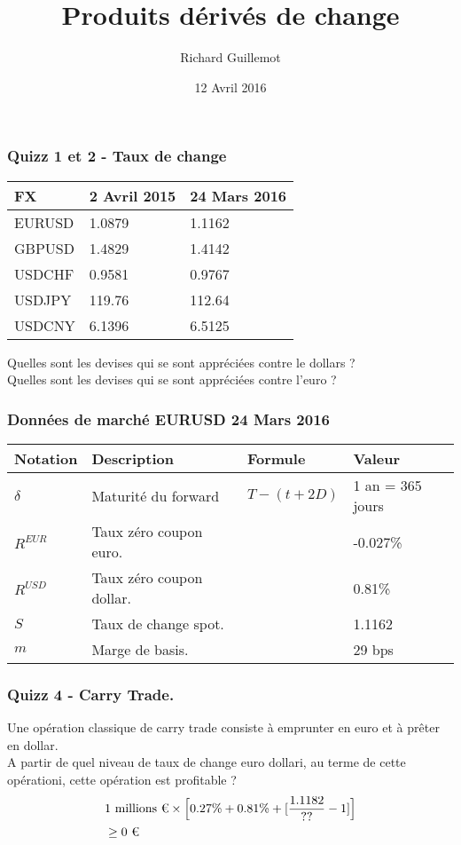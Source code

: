\documentclass{beamer}
\title[Produits dérivés de change et de credit]{Produits dérivés de change}
\author{Richard Guillemot}
\institute{DIFIQ}
\date{12 Avril 2016}
\begin{document}
\begin{frame}
\titlepage
\end{frame}

\begin{frame}
\frametitle{Quizz 1 et 2 - Taux de change}
\begin{center}
\begin{tabular}{|l|l|l|}
\hline
\textbf{FX} & 2 Avril 2015 & 24 Mars 2016  \\
\hline
\hline
EURUSD & 1.0879 & 1.1162  \\
GBPUSD &  1.4829 & 1.4142  \\
USDCHF & 0.9581 & 0.9767  \\
USDJPY & 119.76 & 112.64  \\
USDCNY & 6.1396 & 6.5125  \\
\hline		
\end{tabular}
\end{center}
\vspace{0.5cm}
Quelles sont les devises qui se sont appréciées contre le dollars ?\\
Quelles sont les devises qui se sont appréciées contre l'euro ?\\
\end{frame}

\begin{frame}
\small
\frametitle{Données de marché EURUSD  24 Mars 2016}
\begin{center}
\begin{tabular}{|l|l|l|l|}
\hline
\textbf{Notation} & \textbf{Description} & \textbf{Formule} & \textbf{Valeur} \\
\hline
\hline
$\delta$ & Maturité du forward & $T-(t+2D)$ & 1 an = 365 jours \\
$R^{EUR}$ & Taux zéro coupon euro. &  & -0.027\% \\
$R^{USD}$ & Taux zéro coupon dollar. &  & 0.81\% \\
$S$ & Taux de change spot. &  & 1.1162 \\
$m$ & Marge de basis. &  & 29 bps \\
\hline
\end{tabular}
\end{center}
\end{frame}

\begin{frame}
\frametitle{Quizz 4 - Carry Trade.}
Une opération classique de carry trade consiste à emprunter en euro et à prêter en dollar.\\ 
A partir de quel niveau de taux de change euro dollari, au terme de cette opérationi, cette opération est profitable ?\\
\[
\begin{split}
&\text{1 millions \texteuro} \times \Big[0.27\%+0.81\%+[\frac{1.1182}{\text{??}}-1]\Big]\\
&\geq\text{0 \texteuro}\\
\end{split}
\]
\end{frame}
\end{document}
